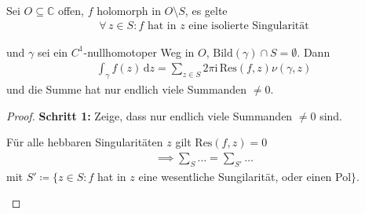 \begin{theorem}[Residuensatz]
  Sei $O \subseteq \mathbb{C}$ offen, $f$ holomorph in $O \setminus S$, es gelte
  \begin{align*}
    \forall \, z \in S : f \text{ hat in $z$ eine isolierte Singularität}
  \end{align*}
  
  und $\gamma$ sei ein $C^1$-nullhomotoper Weg in $O$, $\mathrm{Bild}(\gamma) \cap S = \emptyset$. Dann
  \begin{align*}
    \int_\gamma f(z) \, \mathrm{d}z = \sum\limits_{z \in S} 2 \pi \mathrm{i} \, \mathrm{Res}(f,z) \nu(\gamma,z)
  \end{align*}
  und die Summe hat nur endlich viele Summanden $\neq 0$.
  
  \begin{proof} %
    \textbf{Schritt 1:} Zeige, dass nur endlich viele Summanden $\neq 0$ sind.
    \begin{enum-alph}
      \item Für alle hebbaren Singularitäten $z$ gilt $\mathrm{Res}(f,z) = 0$
      \begin{align*}
        \implies \sum\limits_{S} \ldots = \sum\limits_{S'} \ldots
      \end{align*}
      mit $S' \coloneq \{z \in S : f$ hat in $z$ eine wesentliche Sungilarität, oder einen Pol$\}$.
      

\end{enum-alph}
\end{proof}
\end{theorem}
